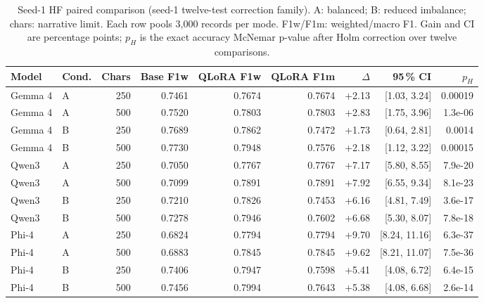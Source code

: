 \begin{table}[tb]
\centering
\footnotesize
\setlength{\tabcolsep}{3pt}
\caption{Seed-1 HF paired comparison (seed-1 twelve-test correction family). A: balanced; B: reduced imbalance; chars: narrative limit. Each row pools 3,000 records per mode. F1w/F1m: weighted/macro F1. Gain and CI are percentage points; $p_H$ is the exact accuracy McNemar p-value after Holm correction over twelve comparisons.}
\label{tab:qlora_full}
\begin{tabular}{llrrrrrrr}
\toprule
Model & Cond. & Chars & Base F1w & QLoRA F1w & QLoRA F1m & $\Delta$ & 95\,\% CI & $p_H$ \\
\midrule
Gemma 4 & A & 250 & 0.7461 & 0.7674 & 0.7674 & +2.13 & [1.03, 3.24] & 0.00019 \\
Gemma 4 & A & 500 & 0.7520 & 0.7803 & 0.7803 & +2.83 & [1.75, 3.96] & 1.3e-06 \\
Gemma 4 & B & 250 & 0.7689 & 0.7862 & 0.7472 & +1.73 & [0.64, 2.81] & 0.0014 \\
Gemma 4 & B & 500 & 0.7730 & 0.7948 & 0.7576 & +2.18 & [1.12, 3.22] & 0.00015 \\
Qwen3 & A & 250 & 0.7050 & 0.7767 & 0.7767 & +7.17 & [5.80, 8.55] & 7.9e-20 \\
Qwen3 & A & 500 & 0.7099 & 0.7891 & 0.7891 & +7.92 & [6.55, 9.34] & 8.1e-23 \\
Qwen3 & B & 250 & 0.7210 & 0.7826 & 0.7453 & +6.16 & [4.81, 7.49] & 3.6e-17 \\
Qwen3 & B & 500 & 0.7278 & 0.7946 & 0.7602 & +6.68 & [5.30, 8.07] & 7.8e-18 \\
Phi-4 & A & 250 & 0.6824 & 0.7794 & 0.7794 & +9.70 & [8.24, 11.16] & 6.3e-37 \\
Phi-4 & A & 500 & 0.6883 & 0.7845 & 0.7845 & +9.62 & [8.21, 11.07] & 7.5e-36 \\
Phi-4 & B & 250 & 0.7406 & 0.7947 & 0.7598 & +5.41 & [4.08, 6.72] & 6.4e-15 \\
Phi-4 & B & 500 & 0.7456 & 0.7994 & 0.7643 & +5.38 & [4.08, 6.68] & 2.6e-14 \\
\bottomrule
\end{tabular}
\end{table}
